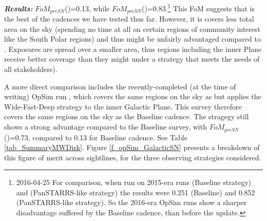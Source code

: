 {\it \bf Results:} $FoM_{preSN}$()=0.13,
while
$FoM_{preSN}$()=0.83.\footnote{2016-04-25 For
  comparison, when run on 2015-era \OpSim runs 
  (Baseline strategy) and  (PanSTARRS-like strategy)
  the results were 0.251 (Baseline) and 0.852 (PanSTARRS-like
  strategy). So the 2016-era OpSim runs show a sharper disadvantage
  suffered by the Baseline cadence, than before the update.} This FoM
suggests that  is the best of the cadences we
have tested thus far. However, it is covers less total area on the sky
(spending no time at all on certain regions of community interest like
the South Polar regions) and thus might be unfairly advantaged
compared to . Exposures are spread over a
smaller area, thus regions including the inner Plane receive better
coverage than they might under a strategy that meets the needs of all
stakeholders).

A more direct comparison includes the recently-completed (at the time
of writing) OpSim run , which
covers the same regions on the sky as  but
applies the Wide-Fast-Deep strategy to the inner Galactic Plane. This
survey therefore covers the same regions on the sky as the Baseline
cadence. The stragegy  still shows
a strong advantage compared to the Baseline survey, with
$FoM_{preSN}$()=0.73, compared to
0.13 for Baseline cadence. See Table \ref{tab_SummaryMWDisk}. Figure
\ref{f_opSim_GalacticSN} presents a breakdown of this figure of merit
across sightlines, for the three observing strategies considered.

